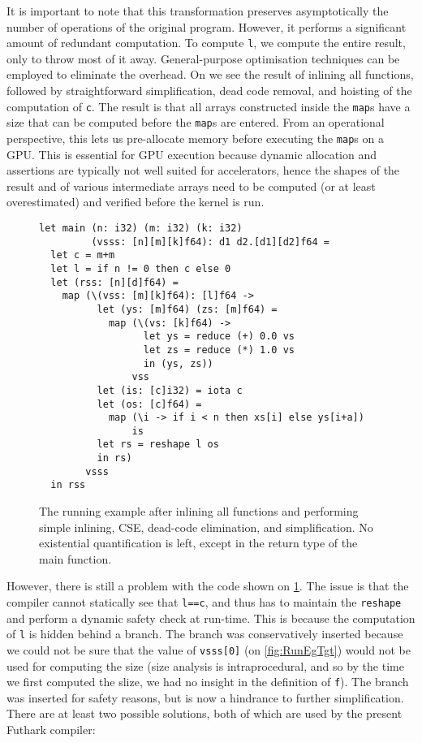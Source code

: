 It is important to note that this transformation preserves
asymptotically the number of operations of the original program.
However, it performs a significant amount of redundant computation.
To compute \lstinline{l}, we compute the entire result, only to throw
most of it away.  General-purpose optimisation techniques can be
employed to eliminate the overhead.  On
 we see the result of inlining all
functions, followed by straightforward simplification, dead code
removal, and hoisting of the computation of \lstinline{c}.  The result
is that all arrays constructed inside the \lstinline{map}s have a size
that can be computed before the \lstinline{map}s are entered.  From an
operational perspective, this lets us pre-allocate memory before
executing the \lstinline{map}s on a GPU.  This is essential for GPU
execution because dynamic allocation and assertions are typically not
well suited for accelerators, hence the shapes of the result and of
various intermediate arrays need to be computed (or at least
overestimated) and verified before the kernel is run.

\begin{figure}
\begin{lstlisting}[xleftmargin=0pt]
let main (n: i32) (m: i32) (k: i32)
         (vsss: [n][m][k]f64): d1 d2.[d1][d2]f64 =
  let c = m+m
  let l = if n != 0 then c else 0
  let (rss: [n][d]f64) =
    map (\(vss: [m][k]f64): [l]f64 ->
          let (ys: [m]f64) (zs: [m]f64) =
            map (\(vs: [k]f64) ->
                  let ys = reduce (+) 0.0 vs
                  let zs = reduce (*) 1.0 vs
                  in (ys, zs))
                vss
          let (is: [c]i32) = iota c
          let (os: [c]f64) =
            map (\i -> if i < n then xs[i] else ys[i+a])
                is
          let rs = reshape l os
          in rs)
        vsss
  in rss
\end{lstlisting}

  \caption{The running example after inlining all functions and
    performing simple inlining, CSE, dead-code elimination, and
    simplification.  No existential quantification is left, except in
    the return type of the main function.}
\label{fig:SimplifyFShape}
\end{figure}

However, there is still a problem with the code shown on
\cref{fig:SimplifyFShape}.  The issue is that the compiler cannot
statically see that \lstinline{l==c}, and thus has to maintain the
\lstinline{reshape} and perform a dynamic safety check at run-time.
This is because the computation of \lstinline{l} is hidden behind a
branch.  The branch was conservatively inserted because we could not
be sure that the value of \lstinline{vsss[0]} (on \cref{fig:RunEgTgt})
would not be used for computing the size (size analysis is
intraprocedural, and so by the time we first computed the slize, we
had no insight in the definition of \lstinline{f}).  The branch was
inserted for safety reasons, but is now a hindrance to further
simplification.  There are at least two possible solutions, both of
which are used by the present Futhark compiler:

